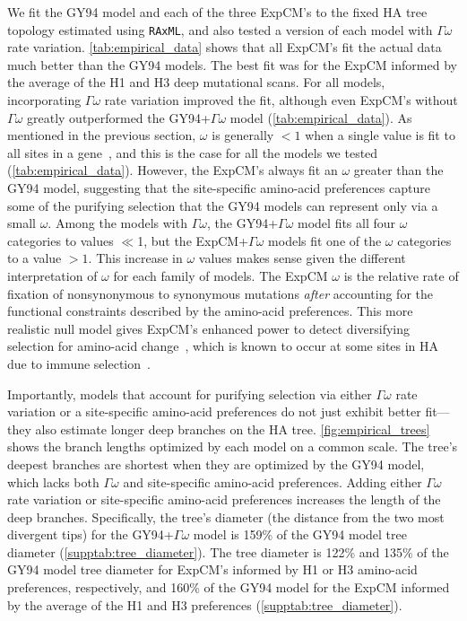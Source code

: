 \documentclass[11pt]{article}
\begin{document}
We fit the GY94 model and each of the three ExpCM's to the fixed HA tree topology estimated using \texttt{RAxML}, and also tested a version of each model with $\Gamma\omega$ rate variation.
\ref{tab:empirical_data} shows that all ExpCM's fit the actual data much better than the GY94 models.
The best fit was for the ExpCM informed by the average of the H1 and H3 deep mutational scans.
For all models, incorporating $\Gamma\omega$ rate variation improved the fit, although even ExpCM's without $\Gamma\omega$ greatly outperformed the GY94+$\Gamma\omega$ model (\ref{tab:empirical_data}).
As mentioned in the previous section, $\omega$ is generally $<1$ when a single value is fit to all sites in a gene~\citep{murrell2015gene}, and this is the case for all the models we tested (\ref{tab:empirical_data}).
However, the ExpCM's always fit an $\omega$ greater than the GY94 model, suggesting that the site-specific amino-acid preferences capture some of the purifying selection that the GY94 models can represent only via a small $\omega$.
Among the models with $\Gamma\omega$, the GY94+$\Gamma\omega$ model fits all four $\omega$ categories to values $\ll$1, but the ExpCM+$\Gamma\omega$ models fit one of the $\omega$ categories to a value $>1$.
This increase in $\omega$ values makes sense given the different interpretation of $\omega$ for each family of models. 
The ExpCM $\omega$ is the relative rate of fixation of nonsynonymous to synonymous mutations \textit{after} accounting for the functional constraints described by the amino-acid preferences.
This more realistic null model gives ExpCM's enhanced power to detect diversifying selection for amino-acid change~\citep{bloom2017identification, rodrigue2017detecting}, which is known to occur at some sites in HA due to immune selection~\citep{bedford2014integrating}.

Importantly, models that account for purifying selection via either $\Gamma\omega$ rate variation or a site-specific amino-acid preferences do not just exhibit better fit---they also estimate longer deep branches on the HA tree. 
\ref{fig:empirical_trees} shows the branch lengths optimized by each model on a common scale.
The tree's deepest branches are shortest when they are optimized by the GY94 model, which lacks both $\Gamma\omega$ and site-specific amino-acid preferences.
Adding either $\Gamma\omega$ rate variation or site-specific amino-acid preferences increases the length of the deep branches.
Specifically, the tree's diameter (the distance from the two most divergent tips) for the GY94+$\Gamma\omega$ model is 159\% of the GY94 model tree diameter (\ref{supptab:tree_diameter}).
The tree diameter is 122\% and 135\% of the GY94 model tree diameter for ExpCM's informed by H1 or H3 amino-acid preferences, respectively, and 160\% of the GY94 model for the ExpCM informed by the average of the H1 and H3 preferences (\ref{supptab:tree_diameter}).
\end{document}
